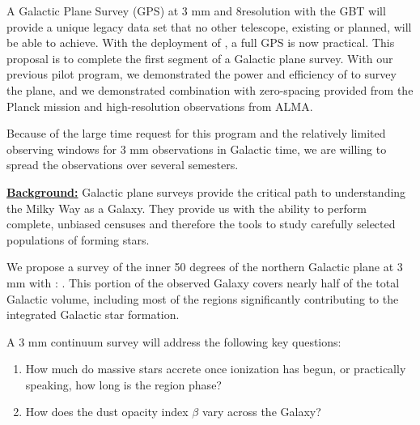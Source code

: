 \documentclass[11pt,preprint]{aastex_nofoot}
\begin{document}


A Galactic Plane Survey (GPS) at 3 mm and 8\arcsec resolution with the GBT will provide a
unique legacy data set that no other telescope, existing or planned, will be
able to achieve.  With the deployment of \MUSTANG, a full GPS is now practical.  This
proposal is to complete the first segment of a Galactic plane survey.  With
our previous pilot program, we demonstrated the power and efficiency of \MUSTANG
to survey the plane, and we demonstrated combination with zero-spacing provided
from the Planck mission and high-resolution observations from ALMA.

Because of the large time request for this program and the relatively limited
observing windows for 3 mm observations in Galactic time, we are willing
to spread the observations over several semesters.

\underline{\bf Background:}
Galactic plane surveys provide the critical path to understanding the Milky Way
as a Galaxy.  They provide us with the ability to perform complete, unbiased
censuses and therefore the tools to study carefully selected populations of forming stars.

We propose a survey of the inner 50 degrees of the northern
Galactic plane at 3 mm with \MUSTANG: \MGPS.  This portion of the observed Galaxy covers
nearly half of the total Galactic volume, including most of the regions significantly
contributing to the integrated Galactic star formation.

A 3 mm continuum survey will address the following key questions:

\vspace{-2.5mm}

\begin{enumerate}

    \item How much do massive stars accrete once ionization has begun, or practically speaking, how
        long is the \hchii region phase?
    \item How does the dust opacity index $\beta$  vary across the Galaxy?  

\end{enumerate}
\vspace{-2.5mm}
\end{document}
